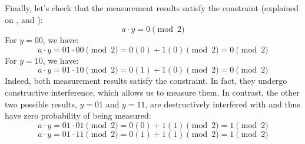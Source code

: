 \highspace
Finally, let's check that the measurement results satisfy the constraint (explained on , and ):
\begin{equation*}
    a \cdot y = 0 \pmod 2
\end{equation*}
For $y=00$, we have:
\begin{equation*}
    a \cdot y = 01 \cdot 00 \pmod 2 = 0(0) + 1(0) \pmod 2 = 0 \pmod 2
\end{equation*}
For $y=10$, we have:
\begin{equation*}
    a \cdot y = 01 \cdot 10 \pmod 2 = 0(1) + 1(0) \pmod 2 = 0 \pmod 2
\end{equation*}
Indeed, both measurement results satisfy the constraint. In fact, they undergo constructive interference, which allows us to measure them. In contrast, the other two possible results, $y = 01$ and $y = 11$, are destructively interfered with and thus have zero probability of being measured:
\begin{equation*}
    a \cdot y = 01 \cdot 01 \pmod 2 = 0(0) + 1(1) \pmod 2 = 1 \pmod 2
\end{equation*}
\begin{equation*}
    a \cdot y = 01 \cdot 11 \pmod 2 = 0(1) + 1(1) \pmod 2 = 1 \pmod 2
\end{equation*}
